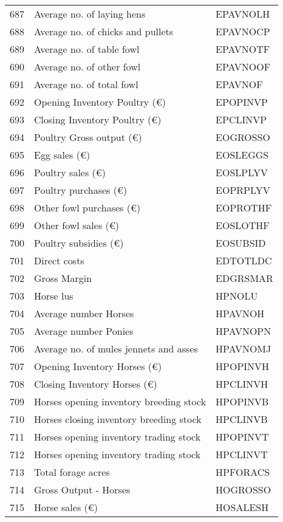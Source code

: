 \documentclass{article}\usepackage{graphicx, color}
\begin{document}
\begin{flushleft}
\begin{table}[ht]
\begin{center}
\begin{tabular}{rll}
  687 & Average no. of laying hens & EPAVNOLH \\ 
  688 & Average no. of chicks and pullets & EPAVNOCP \\ 
  689 & Average no. of table fowl & EPAVNOTF \\ 
  690 & Average no. of other fowl & EPAVNOOF \\ 
  691 & Average no. of total fowl & EPAVNOF \\ 
  692 & Opening Inventory Poultry      (€) & EPOPINVP \\ 
  693 & Closing Inventory Poultry      (€) & EPCLINVP \\ 
  694 & Poultry Gross output (€) & EOGROSSO \\ 
  695 & Egg sales            (€) & EOSLEGGS \\ 
  696 & Poultry sales        (€) & EOSLPLYV \\ 
  697 & Poultry purchases    (€) & EOPRPLYV \\ 
  698 & Other fowl purchases (€) & EOPROTHF \\ 
  699 & Other fowl sales     (€) & EOSLOTHF \\ 
  700 & Poultry subsidies    (€) & EOSUBSID \\ 
  701 & Direct costs & EDTOTLDC \\ 
  702 & Gross Margin & EDGRSMAR \\ 
  703 & Horse lus & HPNOLU \\ 
  704 & Average number Horses & HPAVNOH \\ 
  705 & Average number Ponies & HPAVNOPN \\ 
  706 & Average no. of mules jennets and asses & HPAVNOMJ \\ 
  707 & Opening Inventory Horses      (€) & HPOPINVH \\ 
  708 & Closing Inventory Horses      (€) & HPCLINVH \\ 
  709 & Horses opening inventory breeding stock & HPOPINVB \\ 
  710 & Horses closing inventory breeding stock & HPCLINVB \\ 
  711 & Horses opening inventory trading stock & HPOPINVT \\ 
  712 & Horses opening inventory trading stock & HPCLINVT \\ 
  713 & Total forage acres & HPFORACS \\ 
  714 & Gross Output - Horses & HOGROSSO \\ 
  715 & Horse sales        (€) & HOSALESH \\ 

\end{tabular}
\end{center}
\end{table}
\end{flushleft}
\end{document}
